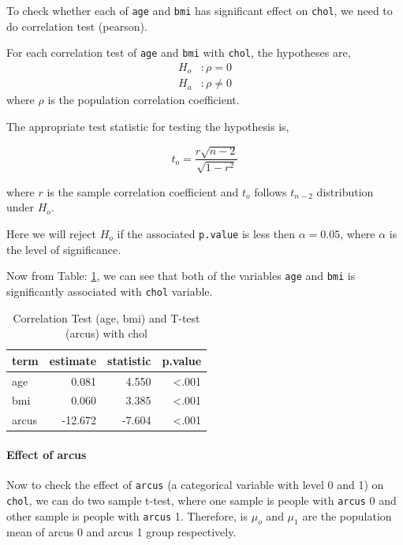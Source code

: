 \documentclass[
  12pt,
  oneside]{article}
\begin{document}
To check whether each of \texttt{age} and \texttt{bmi} has significant effect on \texttt{chol}, we need to do correlation test (pearson).

For each correlation test of \texttt{age} and \texttt{bmi} with \texttt{chol}, the hypotheses are,
\begin{align*}
H_o&: \rho = 0 \\
H_a&: \rho \neq 0
\end{align*}
where \(\rho\) is the population correlation coefficient.

The appropriate test statistic for testing the hypothesis is,

\[
t_o = \frac{r\sqrt{n-2}}{\sqrt{1-r^2}}
\]

where \(r\) is the sample correlation coefficient and \(t_o\) follows \(t_{n-2}\)
distribution under \(H_o\).

Here we will reject \(H_o\) if the associated \texttt{p.value} is less then \(\alpha = 0.05\), where \(\alpha\) is the level of significance.

Now from Table: \ref{tab:Table-02}, we can see that both of the variables \texttt{age} and \texttt{bmi}
is significantly associated with \texttt{chol} variable.

\begin{table}[H]

\caption{\label{tab:Table-02}Correlation Test (age, bmi) and T-test (arcus) with chol}
\centering
\begin{tabular}[t]{lrrr}
\toprule
term & estimate & statistic & p.value\\
\midrule
age & 0.081 & 4.550 & <.001\\
bmi & 0.060 & 3.385 & <.001\\
arcus & -12.672 & -7.604 & <.001\\
\bottomrule
\end{tabular}
\end{table}

\hypertarget{effect-of-arcus}{%
\paragraph{Effect of arcus}\label{effect-of-arcus}}

Now to check the effect of \texttt{arcus} (a categorical variable with level 0 and 1) on \texttt{chol}, we can do two sample t-test, where one sample is people with \texttt{arcus} 0 and
other sample is people with \texttt{arcus} 1. Therefore, is \(\mu_o\) and \(\mu_1\) are the
population mean of arcus 0 and arcus 1 group respectively.
\end{document}
